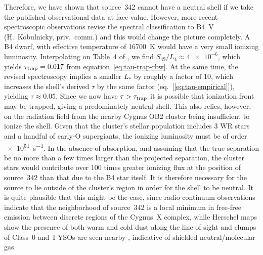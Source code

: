 Therefore, we have shown that source~342 cannot have a neutral shell
if we take the published observational data at face value.  However,
more recent spectroscopic observations revise the spectral
classification to B4~V (H.~Kobulnicky, priv.~comm.) and this would
change the picture completely.  A B4 dwarf, with effective temperature
of \SI{16700}{K} \citep[Tab.~4 of][]{Pecaut:2013a} would have a very
small ionizing luminosity. Interpolating on Table~4 of
\citet{Lanz:2007a}, we find \(S_{49} / L_4 \approx \num{4e-6}\), which
yields \(\tau_{\text{trap}} = 0.017\) from equation~\eqref{eq:tau-trap-rbw}.
At the same time, the revised spectroscopy implies a smaller \(L_*\)
by roughly a factor of 10, which increases the shell's derived
\(\tau\) by the same factor (eq.~[\ref{eq:tau-empirical}]), yielding
\(\tau \approx 0.05\).  Since we now have \(\tau > \tau_{\text{trap}}\) it is
possible that ionization front may be trapped, giving a predominately
neutral shell.  This also relies, however, on the radiation field from
the nearby Cygnus OB2 cluster being insufficient to ionize the shell.
Given that the cluster's stellar population \citep{Wright:2015a}
includes 3 WR stars and a handful of early-O supergiants, the ionizing
luminosity must be of order \SI{e51}{s^{-1}}.  In the absence of
absorption, and assuming that the true separation be no more than a
few times larger than the projected separation, the cluster stars
would contribute over 100 times greater ionizing flux at the position
of source~342 than that due to the B4 star itself.  It is therefore
necessary for the source to lie outside of the cluster's \hii{} region
in order for the shell to be neutral.  It is quite plausible that this
might be the case, since radio continuum observations \citetext{Fig.~4
  of \citealp{Wendker:1991a} and Fig.~7 of \citealp{Tung:2017a}}
indicate that the neighborhood of source~342 is a local minimum in
free-free emission between discrete \hii{} regions of the Cygnus~X
complex, while Herschel maps \citep{Schneider:2016a} show the
presence of both warm and cold dust along the line of sight and clumps
of Class~0 and~I YSOs are seen nearby \citep{Beerer:2010a}, indicative
of shielded neutral/molecular gas.



